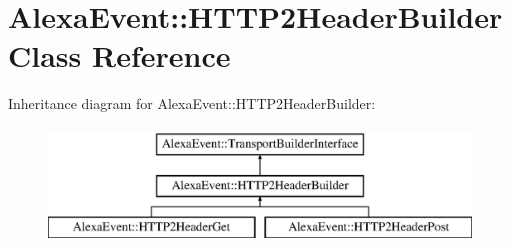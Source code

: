 \hypertarget{classAlexaEvent_1_1HTTP2HeaderBuilder}{}\section{Alexa\+Event\+:\+:H\+T\+T\+P2\+Header\+Builder Class Reference}
\label{classAlexaEvent_1_1HTTP2HeaderBuilder}
Inheritance diagram for Alexa\+Event\+:\+:H\+T\+T\+P2\+Header\+Builder\+:\begin{figure}[H]
\begin{center}
\leavevmode
\includegraphics[height=3.000000cm]{d6/d26/classAlexaEvent_1_1HTTP2HeaderBuilder}
\end{center}
\end{figure}
